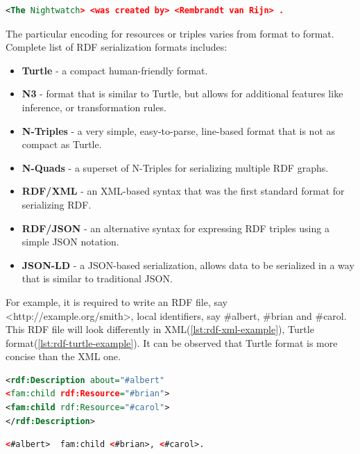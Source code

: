 \documentclass[thesis=M,english,hidelinks]{FITthesis}[2019/12/23]
\begin{document}
\begin{lstlisting}[language=XML, caption=Example of an RDF statement, label = {lst:rdf-statement}]
<The Nightwatch> <was created by> <Rembrandt van Rijn> .
\end{lstlisting}

The particular encoding for resources or triples varies from format to format. Complete list of \gls{RDF} serialization formats includes:
\begin{itemize}
	\item \textbf{Turtle} - a compact human-friendly format.
	\item \textbf{N3} - format that is similar to Turtle, but allows for additional features like inference, or transformation rules.
	\item \textbf{N-Triples} - a very simple, easy-to-parse, line-based format that is not as compact as Turtle.
	\item \textbf{N-Quads} - a superset of N-Triples for serializing multiple \gls{RDF} graphs.
	\item \textbf{RDF/XML} - an XML-based syntax that was the first standard format for serializing RDF.
	\item \textbf{RDF/JSON} - an alternative syntax for expressing RDF triples using a simple JSON notation.
	\item \textbf{JSON-LD} - a JSON-based serialization, allows data to be serialized in a way that is similar to traditional JSON. 
\end{itemize}

For example, it is required to write an \gls{RDF} file,  say \textless http://example.org/smith\textgreater, local identifiers, say  \#albert, \#brian and \#carol.  This  \gls{RDF} file will look differently in \gls{XML}(\ref{lst:rdf-xml-example}), Turtle format(\ref{lst:rdf-turtle-example}). It can be observed that Turtle format is more concise than the \gls{XML} one.

\begin{lstlisting}[language=XML, caption=Example of RDF serialization in XML, label = {lst:rdf-xml-example}]
<rdf:Description about="#albert"
<fam:child rdf:Resource="#brian">
<fam:child rdf:Resource="#carol">
</rdf:Description>
\end{lstlisting}


\begin{lstlisting}[language=XML, caption=Example of RDF serialization in N3/Turtle, label = {lst:rdf-turtle-example}]
	<#albert>  fam:child <#brian>, <#carol>.
\end{lstlisting}
\end{document}
